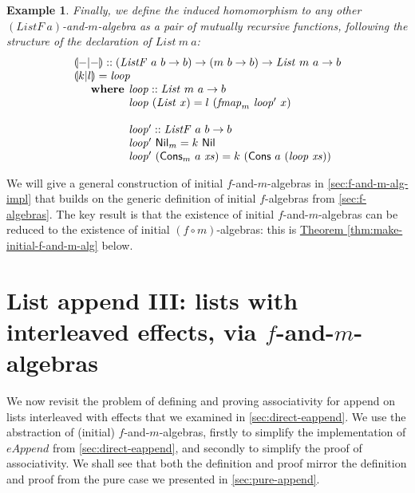\documentclass{jfp1}
\newcommand{\eFold}[2]{\llparenthesis #1|#2 \rrparenthesis}
\newtheorem{example}{Example}
\newcommand{\thmref}[1]{\hyperref[#1]{Theorem \ref*{#1}}}
\newcommand{\kw}[1]{\textbf{#1}}
\begin{document}
\begin{example}
  Finally, we define the induced homomorphism to any other
  $(\mathit{ListF}~a)$-and-$m$-algebra as a pair of mutually recursive
  functions, following the structure of the declaration of
  $\mathit{List}~m~a$:
  \begin{displaymath}
    \begin{array}{l}
      \eFold{-}{-} :: (\mathit{ListF}~a~b \to b) \to (m~b \to b) \to \mathit{List}~m~a \to b \\
      \eFold{k}{l} = \mathit{loop} \\
      \quad\begin{array}{r@{\hspace{0.4em}}l}
        \kw{where} & \mathit{loop} :: \mathit{List}~m~a \to b \\
        & \mathit{loop}~(\mathit{List}~x) = l~(\mathit{fmap}_m~\mathit{loop'}~x) \\
        \\
        & \mathit{loop'} :: \mathit{ListF}~a~b \to b \\
        & \mathit{loop'}~\mathsf{Nil}_m = k~\mathsf{Nil} \\
        & \mathit{loop'}~(\mathsf{Cons}_m~a~\mathit{xs}) = k~(\mathsf{Cons}~a~(\mathit{loop}~\mathit{xs}))
      \end{array}
    \end{array}
  \end{displaymath}
\end{example}
We will give a general construction of initial $f$-and-$m$-algebras in
\autoref{sec:f-and-m-alg-impl} that builds on the generic definition
of initial $f$-algebras from \autoref{sec:f-algebras}. The key result
is that the existence of initial $f$-and-$m$-algebras can be reduced
to the existence of initial $(f \circ m)$-algebras: this is
\thmref{thm:make-initial-f-and-m-alg} below.

\section{List append III: lists with interleaved effects, via \texorpdfstring{$f$}{f}-and-\texorpdfstring{$m$}{m}-algebras}
\label{sec:f-and-m-append}

We now revisit the problem of defining and proving associativity for
append on lists interleaved with effects that we examined in
\autoref{sec:direct-eappend}. We use the abstraction of (initial)
$f$-and-$m$-algebras, firstly to simplify the implementation of
$\mathit{eAppend}$ from \autoref{sec:direct-eappend}, and secondly to
simplify the proof of associativity. We shall see that both the
definition and proof mirror the definition and proof from the
pure case we presented in \autoref{sec:pure-append}.
\end{document}
